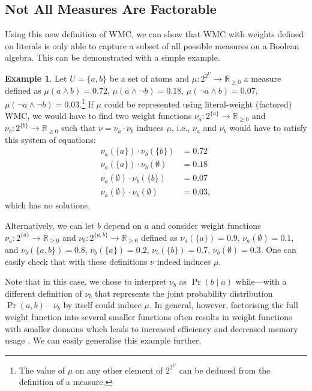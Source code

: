 \documentclass[accepted]{uai2021}
\theoremstyle{definition}
\newtheorem{example}{Example}
\begin{document}
\subsection{Not All Measures Are Factorable}

Using this new definition of WMC, we can show that WMC with weights defined on
literals is only able to capture a subset of all possible measures on a
Boolean algebra. This can be demonstrated with a simple example.

\begin{example}
  Let $U = \{a, b\}$ be a set of atoms and $\mu\colon 2^{2^U} \to
  \mathbb{R}_{\ge 0}$ a measure defined as $\mu(a \land b) = 0.72$, $\mu(a \land
  \neg b) = 0.18$, $\mu(\neg a \land b) = 0.07$, $\mu(\neg a \land \neg b) =
  0.03$.\footnote{The value of $\mu$ on any other element of $2^{2^U}$ can be
    deduced from the definition of a measure.} If $\mu$ could be represented
  using literal-weight (factored) WMC, we would have to find two weight
  functions $\nu_a\colon 2^{\{a\}} \to \mathbb{R}_{\ge 0}$ and $\nu_b\colon
  2^{\{b\}} \to \mathbb{R}_{\ge 0}$ such that $\nu = \nu_a \cdot \nu_b$ induces
  $\mu$, i.e., $\nu_a$ and $\nu_b$ would have to satisfy this system of
  equations:
  \begin{align*}
    \nu_a(\{a\}) \cdot \nu_b(\{b\}) &= 0.72 \\
    \nu_a(\{a\}) \cdot \nu_b(\emptyset) &= 0.18 \\
    \nu_a(\emptyset) \cdot \nu_b(\{b\}) &= 0.07 \\
    \nu_a(\emptyset) \cdot \nu_b(\emptyset) &= 0.03,
  \end{align*}
  which has no solutions.

  Alternatively, we can let $b$ depend on $a$ and consider weight functions
  $\nu_a\colon 2^{\{a\}} \to \mathbb{R}_{\ge 0}$ and $\nu_b\colon 2^{\{a, b\}}
  \to \mathbb{R}_{\ge 0}$ defined as $\nu_a(\{a\}) = 0.9$, $\nu_a(\emptyset) =
  0.1$, and $\nu_b(\{a, b\}) = 0.8$, $\nu_b(\{a\}) = 0.2$, $\nu_b(\{b\}) = 0.7$,
  $\nu_b(\emptyset) = 0.3$. One can easily check that with these definitions
  $\nu$ indeed induces $\mu$.
\end{example}

Note that in this case, we chose to interpret $\nu_b$ as $\Pr(b \mid a)$
while---with a different definition of $\nu_b$ that represents the joint
probability distribution $\Pr(a, b)$---$\nu_b$ by itself could induce $\mu$. In
general, however, factorising the full weight function into several smaller
functions often results in weight functions with smaller domains which leads to
increased efficiency and decreased memory usage
\citep{DBLP:conf/aaai/DudekPV20}. We can easily generalise this example further.
\end{document}
